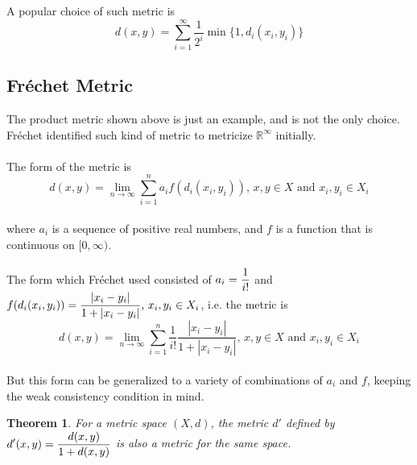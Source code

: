 \documentclass[12pt]{article}
\newtheorem{theorem}{Theorem}
\begin{document}
A popular choice of such metric is
$$
d(x, y) = \sum_{i=1}^{\infty} \frac{1}{2^i} \min\{1,d_i(x_i, y_i)\}
$$

\subsection{Fréchet Metric}
The product metric shown above is just an example, and is not the only choice. Fréchet identified such kind of metric to metricize $\mathbb{R}^\infty$ initially.
\\
\\
The form of the metric is
\begin{equation}
    \boxed{
        d(x, y) = {\lim_{n \to \infty} \sum_{i=1}^{n} a_i f(d_i(x_i, y_i))}\text{, } x, y \in X \text{ and } x_i, y_i \in X_i
        }
        \tag{A}\label{eq:A}
\end{equation}
\\
where $a_i$ is a sequence of positive real numbers, and $f$ is a function that is continuous on $[0, \infty)$.
\\
\\
The form which Fréchet used consisted of $a_i=\mathlarger{\frac{1}{i!}}$ and $f(d_i(x_i, y_i)) = \mathlarger{\frac{|x_i-y_i|}{1+|x_i-y_i|} \text{, } x_i, y_i \in X_i}$, i.e. the metric is
\\
$$
d(x, y) = {\lim_{n \to \infty} \sum_{i=1}^{n} \frac{1}{i!} \frac{|x_i-y_i|}{1+|x_i-y_i|}}\text{, } x, y \in X \text{ and } x_i, y_i \in X_i
$$
\\
But this form can be generalized to a variety of combinations of $a_i$ and $f$, keeping the weak consistency condition in mind.
\begin{theorem}
    For a metric space $(X, d)$, the metric $d'$ defined by $\mathlarger{d'(x,y) = \frac{d(x,y)}{1+d(x,y)}}$ is also a metric for the same space.
\end{theorem}
\end{document}
